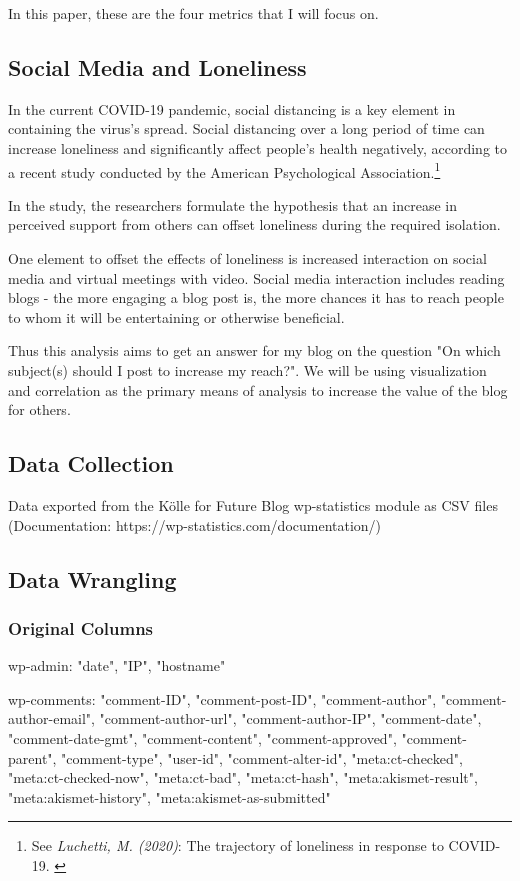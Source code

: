 In this paper, these are the four metrics that I will focus on.

\subsection{Social Media and Loneliness}

In the current COVID-19 pandemic, social distancing is a key element in containing the virus's spread. Social distancing over a long period of time can increase loneliness and significantly affect people's health negatively, according to a recent study conducted by the American Psychological Association.\footnote{See \textit{Luchetti, M. (2020)}: The trajectory of loneliness in response to COVID-19. \cite{apaLoneliness}}

In the study, the researchers formulate the hypothesis that an increase in perceived support from others can offset loneliness during the required isolation.

One element to offset the effects of loneliness is increased interaction on social media and virtual meetings with video. Social media interaction includes reading blogs - the more engaging a blog post is, the more chances it has to reach people to whom it will be entertaining or otherwise beneficial.

Thus this analysis aims to get an answer for my blog on the question "On which subject(s) should I post to increase my reach?". We will be using visualization and correlation as the primary means of analysis to increase the value of the blog for others.

\subsection{Data Collection}

Data exported from the Kölle for Future Blog wp-statistics module as CSV files (Documentation: https://wp-statistics.com/documentation/)

\subsection{Data Wrangling}

\subsubsection{Original Columns}

wp-admin: "date", "IP", "hostname"

wp-comments: "comment-ID", "comment-post-ID", "comment-author", "comment-author-email", "comment-author-url", "comment-author-IP", "comment-date", "comment-date-gmt", "comment-content", "comment-approved", "comment-parent", "comment-type", "user-id", "comment-alter-id", "meta:ct-checked", "meta:ct-checked-now", "meta:ct-bad", "meta:ct-hash", "meta:akismet-result", "meta:akismet-history", "meta:akismet-as-submitted"

